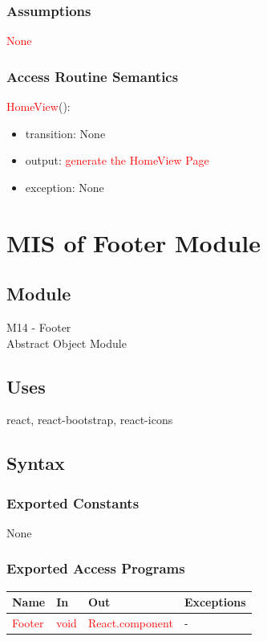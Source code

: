 \documentclass[12pt, titlepage]{article}
\begin{document}
\subsubsection{Assumptions}
\textcolor{red}{None}

\subsubsection{Access Routine Semantics}
\noindent \textcolor{red}{HomeView}():
\begin{itemize}
\item transition: None
\item output: \textcolor{red}{generate the HomeView Page} 
\item exception: None
\end{itemize}

\newpage

\color{red}

\section{MIS of Footer Module} \label{Module} 
\subsection{Module}
M14 - Footer\\
Abstract Object Module

\subsection{Uses}
react, react-bootstrap, react-icons

\subsection{Syntax}
\subsubsection{Exported Constants}
None

\subsubsection{Exported Access Programs}
\begin{center}
\begin{tabular}{p{4cm} p{3cm} p{4cm} p{4cm}}
\hline
\textbf{Name} & \textbf{In} & \textbf{Out} & \textbf{Exceptions} \\
\hline
\textcolor{red}{Footer} & \textcolor{red}{void} & \textcolor{red}{React.component} & - \\
\hline
\end{tabular}
\end{center}
\end{document}
